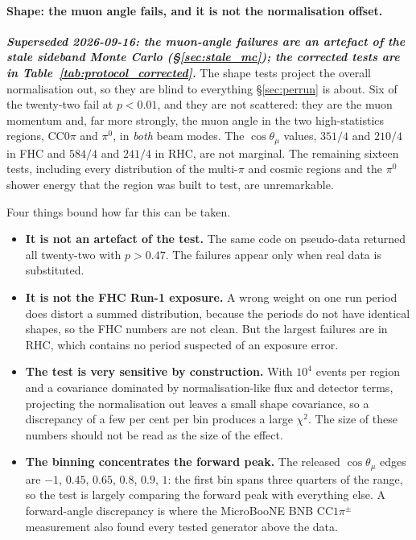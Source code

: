 \documentclass[11pt,a4paper]{article}
\newcommand{\uboone}{MicroBooNE}
\begin{document}
\paragraph{Shape: the muon angle fails, and it is not the normalisation offset.} \textbf{\emph{Superseded
2026-09-16: the muon-angle failures are an artefact of the stale sideband Monte Carlo (\S\ref{sec:stale_mc});
the corrected tests are in Table~\ref{tab:protocol_corrected}.}}
The shape tests project the overall normalisation out, so they are blind to everything
\S\ref{sec:perrun} is about. Six of the twenty-two fail at $p<0.01$, and they are not
scattered: they are the muon momentum and, far more strongly, the muon angle in the two
high-statistics regions, CC$0\pi$ and $\pi^0$, in \emph{both} beam modes. The
$\cos\theta_\mu$ values, $351/4$ and $210/4$ in FHC and $584/4$ and $241/4$ in RHC, are
not marginal. The remaining sixteen tests, including every distribution of the multi-$\pi$
and cosmic regions and the $\pi^0$ shower energy that the region was built to test, are
unremarkable.

Four things bound how far this can be taken.
\begin{itemize}\itemsep3pt
  \item \textbf{It is not an artefact of the test.} The same code on pseudo-data returned
    all twenty-two with $p>0.47$. The failures appear only when real data is substituted.
  \item \textbf{It is not the FHC Run-1 exposure.} A wrong weight on one run period does
    distort a summed distribution, because the periods do not have identical shapes, so
    the FHC numbers are not clean. But the largest failures are in RHC, which contains no
    period suspected of an exposure error.
  \item \textbf{The test is very sensitive by construction.} With $10^4$ events per region
    and a covariance dominated by normalisation-like flux and detector terms, projecting
    the normalisation out leaves a small shape covariance, so a discrepancy of a few per
    cent per bin produces a large $\chi^2$. The size of these numbers should not be read as
    the size of the effect.
  \item \textbf{The binning concentrates the forward peak.} The released
    $\cos\theta_\mu$ edges are $-1$, $0.45$, $0.65$, $0.8$, $0.9$, $1$: the first bin spans
    three quarters of the range, so the test is largely comparing the forward peak with
    everything else. A forward-angle discrepancy is where the \uboone{} BNB
    CC$1\pi^\pm$ measurement also found every tested generator above the data.
\end{itemize}
\end{document}
